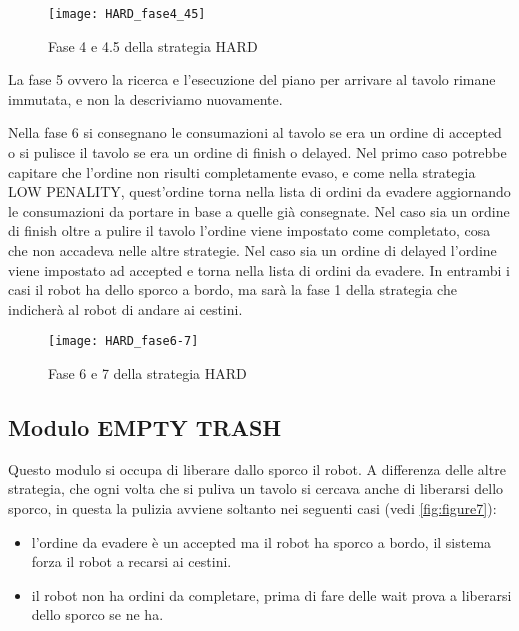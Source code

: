 \begin{figure}[htp]
  \texttt{[image: HARD\_fase4\_45]}
  \caption{Fase 4 e 4.5 della strategia HARD}
  \label{fig:figure9}
\end{figure}

La fase 5 ovvero la ricerca e l'esecuzione del piano per arrivare al tavolo rimane immutata, e non la descriviamo nuovamente.


Nella fase 6 si consegnano le consumazioni al tavolo se era un ordine di accepted o si pulisce il tavolo se era un ordine di finish o delayed.
Nel primo caso potrebbe capitare che l'ordine non risulti completamente evaso, e come nella strategia LOW PENALITY, quest'ordine torna nella lista di ordini da evadere aggiornando le consumazioni da portare in base a quelle già consegnate.
Nel caso sia un ordine di finish oltre a pulire il tavolo l'ordine viene impostato come completato, cosa che non accadeva nelle altre strategie.
Nel caso sia un ordine di delayed l'ordine viene impostato ad accepted e torna nella lista di ordini da evadere. In entrambi i casi il robot ha dello sporco a bordo, ma sarà la fase 1 della strategia che indicherà al robot di andare ai cestini.

\begin{figure}[htp]
  \texttt{[image: HARD\_fase6-7]}
  \caption{Fase 6 e 7 della strategia HARD}
  \label{fig:figure10}
\end{figure}

\subsection{Modulo EMPTY TRASH}
Questo modulo si occupa di liberare dallo sporco il robot. A differenza delle altre strategia, che ogni volta che si puliva un tavolo si cercava anche di liberarsi dello sporco, in questa la pulizia avviene soltanto nei seguenti casi (vedi \ref{fig:figure7}):
\begin{itemize}
  \item l'ordine da evadere è un accepted ma il robot ha sporco a bordo, il sistema forza il robot a recarsi ai cestini.
  \item il robot non ha ordini da completare, prima di fare delle wait prova a liberarsi dello sporco se ne ha.
\end{itemize}

